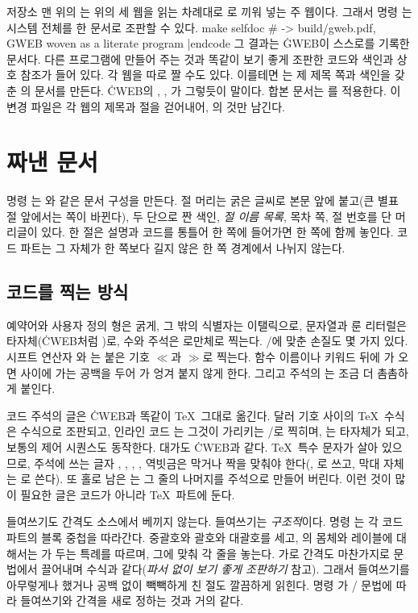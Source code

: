 저장소 맨 위의 는 위의 세 웹을 읽는 차례대로 로 끼워 넣는
주 웹이다. 그래서 명령 는 시스템 전체를 한 문서로 조판할 수 있다.
\begincode
make selfdoc      # -> build/gweb.pdf, GWEB woven as a literate program
|endcode
\noindent 그 결과는 \.{GWEB}이 스스로를 기록한 문서다. 다른 프로그램에 만들어
주는 것과 똑같이 보기 좋게 조판한 코드와 색인과 상호 참조가 들어 있다. 각 웹을
따로 짤 수도 있다. 이를테면 는 제 제목 쪽과
색인을 갖춘 의 문서를 만든다. \.{CWEB}의 ,
, 가 그렇듯이 말이다. 합본 문서는 를
적용한다. 이 변경 파일은 각 웹의 제목과  절을 걷어내어,
의 것만 남긴다.

\chapter{짜낸 문서}
\noindent
명령 는 와 같은 문서 구성을 만든다. 절 머리는 굵은
글씨로 본문 앞에 붙고(큰 별표 절 앞에서는 쪽이 바뀐다), 두 단으로 짠 색인,
{\it 절 이름 목록\/}, 목차 쪽, 절 번호를 단 머리글이 있다. 한 절은 설명과
코드를 통틀어 한 쪽에 들어가면 한 쪽에 함께 놓인다. 코드 파트는 그 자체가 한
쪽보다 길지 않은 한 쪽 경계에서 나뉘지 않는다.

\section{코드를 찍는 방식}
예약어와 사용자 정의 형은 굵게, 그 밖의 식별자는 이탤릭으로, 문자열과 룬
리터럴은 타자체(\.{CWEB}처럼 )로, 수와 주석은 로만체로 찍는다.
\GO/에 맞춘 손질도 몇 가지 있다. 시프트 연산자 \cw{<<}와 \cw{>>}는 붙은 기호
$\ll$과 $\gg$로 찍는다. 함수 이름이나 키워드 뒤에 \cw{(}가 오면 사이에 가는
공백을 두어 가 엉겨 붙지 않게 한다. 그리고 주석의 \cw{//}는 조금 더
촘촘하게 붙인다.

코드 주석의 글은 \.{CWEB}과 똑같이 \TeX\ 그대로 옮긴다. 달러 기호 사이의
\TeX\ 수식은 수식으로 조판되고, 인라인 코드 는 그것이 가리키는
\GO/로 찍히며, 는 타자체가 되고, 보통의 제어
시퀀스도 동작한다. 대가도 \.{CWEB}과 같다. \TeX\ 특수 문자가 살아 있으므로,
주석에 쓰는 글자 , \cw{\$}, \cw{\%}, , 역빗금은
막거나 짝을 맞춰야 한다(, \cw{\bs\$}로 쓰고, 막대 자체는
로 쓴다). 또 홀로 남은 \cw{\%}는 그 줄의 나머지를 주석으로
만들어 버린다. 이런 것이 많이 필요한 글은 코드가 아니라 \TeX\ 파트에 둔다.

들여쓰기도 간격도 소스에서 베끼지 않는다. 들여쓰기는 {\it 구조적\/}이다.
명령 는 각 코드 파트의 블록 중첩을 따라간다. 중괄호와 괄호와
대괄호를 세고, 의  몸체와 레이블에 대해서는 가
두는 특례를 따르며, 그에 맞춰 각 줄을 놓는다. 가로 간격도 마찬가지로 문법에서
끌어내며 수식과 같다({\it 파서 없이 보기 좋게 조판하기\/} 참고). 그래서
들여쓰기를 아무렇게나 했거나 공백 없이 빽빽하게 친 절도 깔끔하게 읽힌다.
명령 가 \CEE/ 문법에 따라 들여쓰기와 간격을 새로 정하는 것과 거의
같다.

